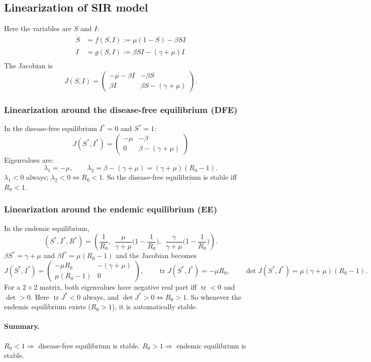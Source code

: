 \subsection{Linearization of SIR model}
Here the variables are $S$ and $I$:
\begin{align*}
\dot S &= f(S,I) := \mu(1-S)-\beta SI \\
\dot I &= g(S,I) := \beta SI - (\gamma+\mu)I\\ 
\end{align*}
The Jacobian is
\[
J(S,I) = \begin{pmatrix} -\mu-\beta I & -\beta S \\ \beta I & \beta S-(\gamma+\mu) \end{pmatrix}.
\]


\subsubsection{Linearization around the disease-free equilibrium (DFE)}
In the disease-free equilibrium $I^*=0$ and $S^*=1$:
\[
J(S^*, I^*) = \begin{pmatrix} -\mu & -\beta \\ 0 & \beta-(\gamma+\mu) \end{pmatrix}
\]
Eigenvalues are:
\[
\lambda_1 = -\mu, \qquad \lambda_2 = \beta-(\gamma+\mu) = (\gamma+\mu)(R_0-1).
\]
$\lambda_1<0$ always; $\lambda_2<0 \iff R_0<1$. So the disease-free
equilibrium is stable iff $R_0<1$.

\subsubsection{Linearization around the endemic equilibrium (EE)}
In the endemic equilibrium,
\[
(S^*,I^*,R^*) =
\left(\frac{1}{R_0},\ \ \frac{\mu}{\gamma+\mu}\Big(1-\frac{1}{R_0}\Big),\ \ \frac{\gamma}{\gamma+\mu}\Big(1-\frac{1}{R_0}\Big)\right).
 \]
$\beta S^*=\gamma+\mu$ and $\beta
I^*=\mu(R_0-1)$ and the Jacobian becomes
\[
J(S^*,I^*) = \begin{pmatrix} -\mu R_0 & -(\gamma+\mu) \\ \mu(R_0-1) & 0 \end{pmatrix},
\qquad
\operatorname{tr}J(S^*,I^*) = -\mu R_0, \qquad \det J(S^*,I^*) = \mu(\gamma+\mu)(R_0-1).
\]
For a $2\times 2$ matrix, both eigenvalues have negative real part iff
$\operatorname{tr}<0$ and $\det>0$. Here $\operatorname{tr}J^*<0$
always, and $\det J^*>0 \iff R_0>1$. So whenever the endemic
equilibrium exists ($R_0>1$), it is automatically stable.

\paragraph{Summary.}
$R_0<1 \Rightarrow$ disease-free equilibrium is stable. $R_0>1 \Rightarrow$ endemic equilibrium is stable.
